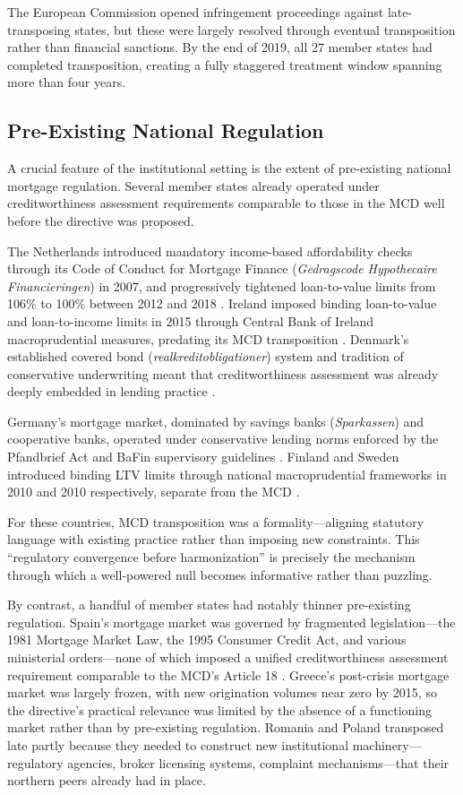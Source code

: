 \documentclass[12pt]{article}
\begin{document}
The European Commission opened infringement proceedings against late-transposing states, but these were largely resolved through eventual transposition rather than financial sanctions. By the end of 2019, all 27 member states had completed transposition, creating a fully staggered treatment window spanning more than four years.


\subsection{Pre-Existing National Regulation}

A crucial feature of the institutional setting is the extent of pre-existing national mortgage regulation. Several member states already operated under creditworthiness assessment requirements comparable to those in the MCD well before the directive was proposed.

The Netherlands introduced mandatory income-based affordability checks through its Code of Conduct for Mortgage Finance (\textit{Gedragscode Hypothecaire Financieringen}) in 2007, and progressively tightened loan-to-value limits from 106\% to 100\% between 2012 and 2018 \citep{dnb_2014_macropru}. Ireland imposed binding loan-to-value and loan-to-income limits in 2015 through Central Bank of Ireland macroprudential measures, predating its MCD transposition \citep{central_bank_ireland_2014}. Denmark's established covered bond (\textit{realkreditobligationer}) system and tradition of conservative underwriting meant that creditworthiness assessment was already deeply embedded in lending practice \citep{campbell_2003_household}.

Germany's mortgage market, dominated by savings banks (\textit{Sparkassen}) and cooperative banks, operated under conservative lending norms enforced by the Pfandbrief Act and BaFin supervisory guidelines \citep{bholat_2018_mortgage}. Finland and Sweden introduced binding LTV limits through national macroprudential frameworks in 2010 and 2010 respectively, separate from the MCD \citep{cerutti_2017_macropru}.

For these countries, MCD transposition was a formality---aligning statutory language with existing practice rather than imposing new constraints. This ``regulatory convergence before harmonization'' is precisely the mechanism through which a well-powered null becomes informative rather than puzzling.

By contrast, a handful of member states had notably thinner pre-existing regulation. Spain's mortgage market was governed by fragmented legislation---the 1981 Mortgage Market Law, the 1995 Consumer Credit Act, and various ministerial orders---none of which imposed a unified creditworthiness assessment requirement comparable to the MCD's Article 18 \citep{fernandez_vidaurreta_2023_mortgage}. Greece's post-crisis mortgage market was largely frozen, with new origination volumes near zero by 2015, so the directive's practical relevance was limited by the absence of a functioning market rather than by pre-existing regulation. Romania and Poland transposed late partly because they needed to construct new institutional machinery---regulatory agencies, broker licensing systems, complaint mechanisms---that their northern peers already had in place.
\end{document}
